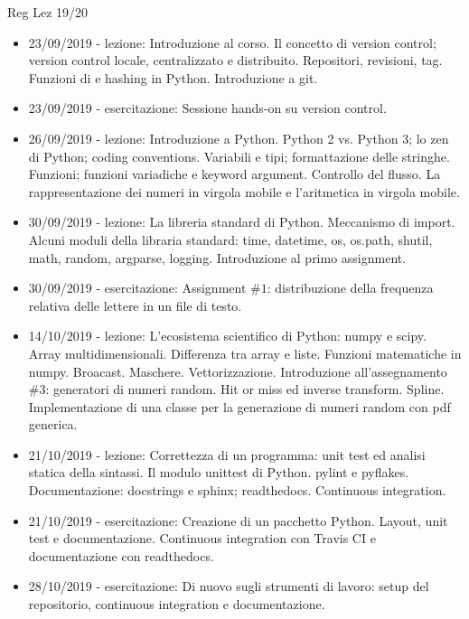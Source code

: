 \begin{frame}[allowframebreaks]{Reg Lez 19/20}
\begin{itemize}
\item 23/09/2019 - lezione: Introduzione al corso. Il concetto di version control; version control locale, centralizzato e distribuito. Repositori, revisioni, tag. Funzioni di  e hashing in Python. Introduzione a git.
\item 23/09/2019 - esercitazione: Sessione hands-on su version control.
\item 26/09/2019 - lezione: Introduzione a Python. Python 2 vs. Python 3; lo zen di Python; coding conventions. Variabili e tipi; formattazione delle stringhe. Funzioni; funzioni variadiche e keyword argument. Controllo del flusso. La rappresentazione dei numeri in virgola mobile e l'aritmetica in virgola mobile.
\item 30/09/2019 - lezione: La libreria standard di Python. Meccanismo di import. Alcuni moduli della libraria standard: time, datetime, os, os.path, shutil, math, random, argparse, logging. Introduzione al primo assignment.
\item 30/09/2019 - esercitazione: Assignment $\#1$: distribuzione della frequenza relativa delle lettere in un file di testo.
\item 14/10/2019 - lezione: L'ecosistema scientifico di Python: numpy e scipy. Array multidimensionali. Differenza tra array e liste. Funzioni matematiche in numpy. Broacast. Maschere. Vettorizzazione. Introduzione all'assegnamento $\#3$: generatori di numeri random. Hit or miss ed inverse transform. Spline. Implementazione di una classe per la generazione di numeri random con pdf generica.
\item 21/10/2019 - lezione: Correttezza di un programma: unit test ed analisi statica della sintassi. Il modulo unittest di Python. pylint e pyflakes. Documentazione: docstrings e sphinx; readthedocs. Continuous integration.
\item 21/10/2019 - esercitazione: Creazione di un pacchetto Python. Layout, unit test e documentazione. Continuous integration con Travis CI e documentazione con readthedocs.
\item 28/10/2019 - esercitazione: Di nuovo sugli strumenti di lavoro: setup del repositorio, continuous integration e documentazione.
\end{itemize}



\end{frame}
